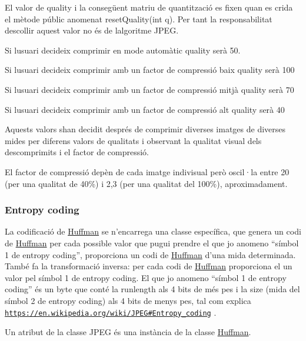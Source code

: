 El valor de quality i la consegüent matriu de quantització es fixen quan es crida el mètode públic anomenat reset\+Quality(int q). Per tant la responsabilitat d\textquotesingle{}escollir aquest valor no és de l\textquotesingle{}algoritme J\+P\+EG.


\begin{DoxyItemize}
\item Si l\textquotesingle{}usuari decideix comprimir en mode automàtic quality serà 50.
\item Si l\textquotesingle{}usuari decideix comprimir amb un factor de compressió baix quality serà 100
\item Si l\textquotesingle{}usuari decideix comprimir amb un factor de compressió mitjà quality serà 70
\item Si l\textquotesingle{}usuari decideix comprimir amb un factor de compressió alt quality serà 40
\end{DoxyItemize}

Aquests valors s\textquotesingle{}han decidit després de comprimir diverses imatges de diverses mides per diferens valors de qualitats i observant la qualitat visual dels descomprimits i el factor de compressió.

El factor de compressió depèn de cada imatge indivisual però oscil·la entre 20 (per una qualitat de 40\%) i 2,3 (per una qualitat del 100\%), aproximadament.

\subsubsection*{Entropy coding}

La codificació de \hyperlink{classHuffman}{Huffman} se n’encarrega una classe específica, que genera un codi de \hyperlink{classHuffman}{Huffman} per cada possible valor que pugui prendre el que jo anomeno “símbol 1 de entropy coding”, proporciona un codi de \hyperlink{classHuffman}{Huffman} d’una mida determinada. També fa la transformació inversa\+: per cada codi de \hyperlink{classHuffman}{Huffman} proporciona el un valor pel símbol 1 de entropy coding. El que jo anomeno “símbol 1 de entropy coding” és un byte que conté la runlength als 4 bits de més pes i la size (mida del símbol 2 de entropy coding) als 4 bits de menys pes, tal com explica \href{https://en.wikipedia.org/wiki/JPEG#Entropy_coding}{\tt https\+://en.\+wikipedia.\+org/wiki/\+J\+P\+E\+G\#\+Entropy\+\_\+coding} .

Un atribut de la classe J\+P\+EG és una instància de la classe \hyperlink{classHuffman}{Huffman}.

